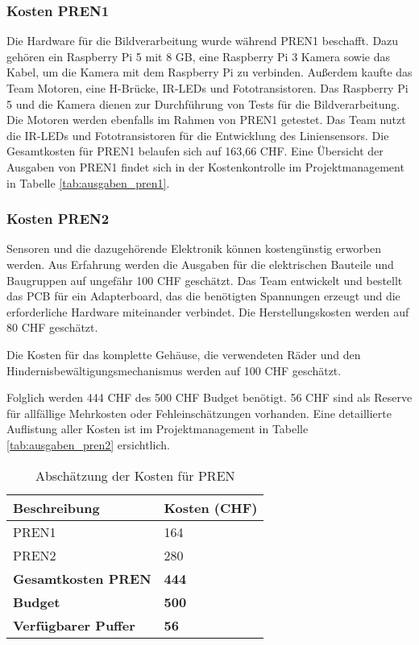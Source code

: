 \documentclass[../main.tex]{subfiles}
\begin{document}
\subsubsection{Kosten PREN1}
Die Hardware für die Bildverarbeitung wurde während PREN1 beschafft. Dazu gehören ein Raspberry Pi 5 mit 8 GB, eine Raspberry Pi 3 Kamera sowie das Kabel, um die Kamera mit dem Raspberry Pi zu verbinden. Außerdem kaufte das Team Motoren, eine H-Brücke, IR-LEDs und Fototransistoren. Das Raspberry Pi 5 und die Kamera dienen zur Durchführung von Tests für die Bildverarbeitung. Die Motoren werden ebenfalls im Rahmen von PREN1 getestet. Das Team nutzt die IR-LEDs und Fototransistoren für die Entwicklung des Liniensensors. Die Gesamtkosten für PREN1 belaufen sich auf 163,66 CHF. Eine Übersicht der Ausgaben von PREN1 findet sich in der Kostenkontrolle im Projektmanagement in Tabelle \ref{tab:ausgaben_pren1}.

\subsubsection{Kosten PREN2}
Sensoren und die dazugehörende Elektronik können kostengünstig erworben werden. Aus Erfahrung werden die Ausgaben für die elektrischen Bauteile und Baugruppen auf ungefähr 100 CHF geschätzt. Das Team entwickelt und bestellt das PCB für ein Adapterboard, das die benötigten Spannungen erzeugt und die erforderliche Hardware miteinander verbindet. Die Herstellungskosten werden auf 80 CHF geschätzt.

Die Kosten für das komplette Gehäuse, die verwendeten Räder und den Hindernisbewältigungsmechanismus werden auf 100 CHF geschätzt.

Folglich werden 444 CHF des 500 CHF Budget benötigt. 56 CHF sind als Reserve für allfällige Mehrkosten oder Fehleinschätzungen vorhanden. Eine detaillierte Auflistung aller Kosten ist im Projektmanagement in Tabelle \ref{tab:ausgaben_pren2} ersichtlich.

\begin{table}[h!]
    \centering
    \begin{tabular}{|p{5cm}|p{3cm}|}
        \hline
        \textbf{Beschreibung} & \textbf{Kosten (CHF)} \\
        \hline
        PREN1 & 164 \\
        \hline
        PREN2 & 280 \\
        \hline
        \textbf{Gesamtkosten PREN} & \textbf{444} \\
        \hline
        \textbf{Budget} & \textbf{500} \\
        \hline
        \textbf{Verfügbarer Puffer} & \textbf{56} \\
        \hline
    \end{tabular}
    \caption{Abschätzung der Kosten für PREN}
    \label{tab:kostenuebersicht}
\end{table}
\end{document}
